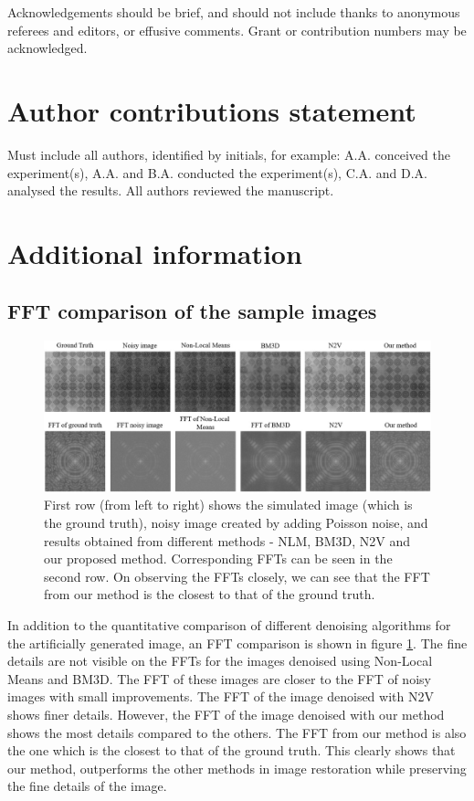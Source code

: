 \documentclass[fleqn,10pt]{wlscirep}
\begin{document}
	Acknowledgements should be brief, and should not include thanks to anonymous referees and editors, or effusive comments. Grant or contribution numbers may be acknowledged.
	
	\section*{Author contributions statement}
	
	Must include all authors, identified by initials, for example:
	A.A. conceived the experiment(s),  A.A. and B.A. conducted the experiment(s), C.A. and D.A. analysed the results.  All authors reviewed the manuscript. 
	
	\section*{Additional information}
	
	\subsection*{FFT comparison of the sample images}
	\label{fft_comparison}
	
	\begin{figure}[H]
		\centering
		\includegraphics[scale=0.6]{./imgs/comparison-sample_fft.jpg}
		\caption{First row (from left to right) shows the simulated image (which is the ground truth), noisy image created by adding Poisson noise, and  results obtained from different methods - NLM, BM3D, N2V and our proposed method. Corresponding FFTs can be seen in the second row. On observing the FFTs closely, we can see that the FFT from our method is the closest to that of the ground truth.}
		\label{fig:comparison_sample_fft}
	\end{figure}

	In addition to the quantitative comparison of different denoising algorithms for the artificially generated image, an FFT comparison is shown in figure \ref{fig:comparison_sample_fft}. The fine details are not visible on the FFTs for the images denoised using Non-Local Means and BM3D. The FFT of these images are closer to the FFT of noisy images with small improvements. The FFT of the image denoised with N2V shows finer details. However, the FFT of the image denoised with our method shows the most details compared to the others. The FFT from our method is also the one which is the closest to that of the ground truth. This clearly shows that our method, outperforms the other methods in image restoration while preserving the fine details of the image. 
	
\end{document}
